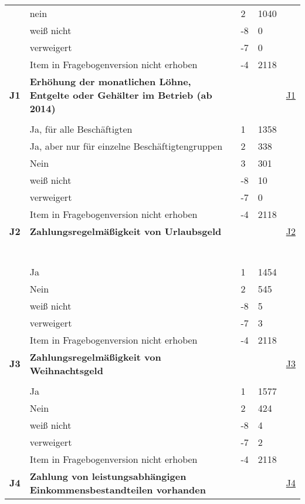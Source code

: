 \begin{longtable}{| L{2.5cm} | L{8.25cm}| C{1.5cm} | R{1.25cm} | C{2.25cm} |  }
   & nein & 2 & 1040 &  \\ 
   & weiß nicht & -8 & 0 &  \\ 
   & verweigert & -7 & 0 &  \\ 
   & Item in Fragebogenversion nicht erhoben & -4 & 2118 &  \\ 
   \midrule
\textbf{J1}\label{var:suf:J1} & \textbf{Erhöhung der monatlichen Löhne, Entgelte oder Gehälter im Betrieb (ab 2014)} &  &  & \hyperref[J1]{J1} \\ 
   &  &  &  &  \\ 
   & Ja, für alle Beschäftigten & 1 & 1358 &  \\ 
   & Ja, aber nur für einzelne Beschäftigtengruppen & 2 & 338 &  \\ 
   & Nein & 3 & 301 &  \\ 
   & weiß nicht & -8 & 10 &  \\ 
   & verweigert & -7 & 0 &  \\ 
   & Item in Fragebogenversion nicht erhoben & -4 & 2118 &  \\ 
   \midrule
\textbf{J2}\label{var:suf:J2} & \textbf{Zahlungsregelmäßigkeit von Urlaubsgeld} &  &  & \hyperref[J2]{J2} \\ 
   & \protect\subsection[Variablen J2 bis L1]{} &  &  &  \\ 
   & Ja & 1 & 1454 &  \\ 
   & Nein & 2 & 545 &  \\ 
   & weiß nicht & -8 & 5 &  \\ 
   & verweigert & -7 & 3 &  \\ 
   & Item in Fragebogenversion nicht erhoben & -4 & 2118 &  \\ 
   \midrule
\textbf{J3}\label{var:suf:J3} & \textbf{Zahlungsregelmäßigkeit von Weihnachtsgeld} &  &  & \hyperref[J3]{J3} \\ 
   &  &  &  &  \\ 
   & Ja & 1 & 1577 &  \\ 
   & Nein & 2 & 424 &  \\ 
   & weiß nicht & -8 & 4 &  \\ 
   & verweigert & -7 & 2 &  \\ 
   & Item in Fragebogenversion nicht erhoben & -4 & 2118 &  \\ 
   \midrule
\textbf{J4}\label{var:suf:J4} & \textbf{Zahlung von leistungsabhängigen Einkommensbestandteilen vorhanden} &  &  & \hyperref[J4]{J4} \\ 

\end{longtable}
